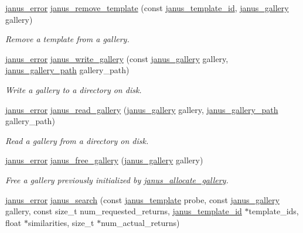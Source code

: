 \begin{DoxyCompactItemize}
\hyperlink{group__janus_ga1b275e4dade484951b366f785597b8f6}{janus\+\_\+error} \hyperlink{group__janus_gafa0ed65ab1b78ff570142f36cf506f38}{janus\+\_\+remove\+\_\+template} (const \hyperlink{group__janus_ga666a973aaa28bebd89ea5da37853bb87}{janus\+\_\+template\+\_\+id}, \hyperlink{group__janus_ga64368fd83d5e9abfd9ef6ab6231866e8}{janus\+\_\+gallery} gallery)
\begin{DoxyCompactList}\small\item\em Remove a template from a gallery. \end{DoxyCompactList}\item 
\hyperlink{group__janus_ga1b275e4dade484951b366f785597b8f6}{janus\+\_\+error} \hyperlink{group__janus_ga874a3668ca302fbff98e0df4cfa1a31c}{janus\+\_\+write\+\_\+gallery} (const \hyperlink{group__janus_ga64368fd83d5e9abfd9ef6ab6231866e8}{janus\+\_\+gallery} gallery, \hyperlink{group__janus_ga59a8cde3e9e96f7e337f9e1ebf5b4eac}{janus\+\_\+gallery\+\_\+path} gallery\+\_\+path)
\begin{DoxyCompactList}\small\item\em Write a gallery to a directory on disk. \end{DoxyCompactList}\item 
\hyperlink{group__janus_ga1b275e4dade484951b366f785597b8f6}{janus\+\_\+error} \hyperlink{group__janus_ga0e429c956e7c233414b7c64b18ee64ef}{janus\+\_\+read\+\_\+gallery} (\hyperlink{group__janus_ga64368fd83d5e9abfd9ef6ab6231866e8}{janus\+\_\+gallery} gallery, \hyperlink{group__janus_ga59a8cde3e9e96f7e337f9e1ebf5b4eac}{janus\+\_\+gallery\+\_\+path} gallery\+\_\+path)
\begin{DoxyCompactList}\small\item\em Read a gallery from a directory on disk. \end{DoxyCompactList}\item 
\hyperlink{group__janus_ga1b275e4dade484951b366f785597b8f6}{janus\+\_\+error} \hyperlink{group__janus_ga0bd53aa0a141def4fcd8ec3235c2c87b}{janus\+\_\+free\+\_\+gallery} (\hyperlink{group__janus_ga64368fd83d5e9abfd9ef6ab6231866e8}{janus\+\_\+gallery} gallery)
\begin{DoxyCompactList}\small\item\em Free a gallery previously initialized by \hyperlink{group__janus_ga38b61036a5fb27671ee104c61f35a0b7}{janus\+\_\+allocate\+\_\+gallery}. \end{DoxyCompactList}\item 
\hyperlink{group__janus_ga1b275e4dade484951b366f785597b8f6}{janus\+\_\+error} \hyperlink{group__janus_ga3ad534c34ae38082eb49ce8457545653}{janus\+\_\+search} (const \hyperlink{group__janus_gaabac6b357615bbd03a082c714190e2d0}{janus\+\_\+template} probe, const \hyperlink{group__janus_ga64368fd83d5e9abfd9ef6ab6231866e8}{janus\+\_\+gallery} gallery, const size\+\_\+t num\+\_\+requested\+\_\+returns, \hyperlink{group__janus_ga666a973aaa28bebd89ea5da37853bb87}{janus\+\_\+template\+\_\+id} $\ast$template\+\_\+ids, float $\ast$similarities, size\+\_\+t $\ast$num\+\_\+actual\+\_\+returns)

\end{DoxyCompactItemize}
